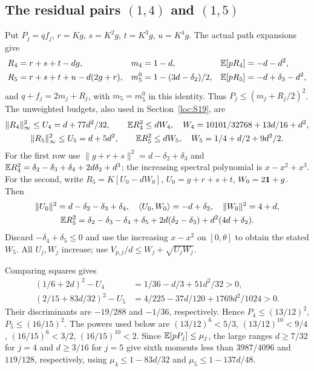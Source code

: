 \subsection[The residual pairs (1,4) and (1,5)]{The residual pairs $(1,4)$ and $(1,5)$}\label{loc:S8}
Put $P_j=qf_j$, $r=Kg$, $s=K^2g$, $t=K^3g$, $u=K^4g$.
The actual path expansions give
\begin{align*}
 R_4&=r+s+t-dg,&m_4&=1-d,&\mathbb E[pR_4]&=-d-d^2,\\
 R_5&=r+s+t+u-d(2g+r),&m_5^0&=1-(3d-\delta_{2})/2,&\mathbb E[pR_5]&=-d+\delta_{3}-d^2,
\end{align*}
and $q+f_j=2m_j+R_j$, with $m_5=m_5^0$ in this identity.
Thus $P_j\le(m_j+R_j/2)^2$.
The unweighted budgets, also used in Section~\ref{loc:S19}, are
\begin{gather*}
 \|R_4\|_\infty^2\le U_4=d+77d^2/32,\qquad
 \mathbb E R_4^2\le dW_4,\quad W_4=10101/32768+13d/16+d^2,\\
 \|R_5\|_\infty^2\le U_5=d+5d^2,\qquad
 \mathbb E R_5^2\le dW_5,\quad W_5=1/4+d/2+9d^2/2.
\end{gather*}
For the first row use
$\|g+r+s\|^2=d-\delta_{2}+\delta_{3}$ and
$\mathbb E R_4^2=\delta_{2}-\delta_{3}+\delta_{4}+2d\delta_{2}+d^3$;
the increasing spectral polynomial is $x-x^2+x^3$.
For the second, write $R_5=K[U_0-dW_0]$,
$U_0=g+r+s+t$, $W_0=2\mathbf1+g$. Then
\begin{gather*}
 \|U_0\|^2=d-\delta_{2}-\delta_{3}+\delta_{4},\quad
 \langle U_0,W_0\rangle=-d+\delta_{2},\quad\|W_0\|^2=4+d,\\
 \mathbb E R_5^2=\delta_{2}-\delta_{3}-\delta_{4}+\delta_{5}+2d(\delta_{2}-\delta_{3})+d^2(4d+\delta_{2}).
\end{gather*}
Discard $-\delta_{4}+\delta_{5}\le0$ and use the increasing $x-x^2$ on
$[0,\theta]$ to obtain the stated $W_5$.
All $U_j,W_j$ increase; use $V_{p,j}/d\le W_j+\sqrt{U_jW_j}$.

Comparing squares gives
\begin{align*}
 (1/6+2d)^2-U_4&=1/36-d/3+51d^2/32>0,\\
 (2/15+83d/32)^2-U_5&=4/225-37d/120+1769d^2/1024>0.
\end{align*}
Their discriminants are $-19/288$ and $-1/36$, respectively.
Hence $P_4\le(13/12)^2$, $P_5\le(16/15)^2$.
The powers used below are
$(13/12)^6<5/3$, $(13/12)^{10}<9/4$,
$(16/15)^6<3/2$, $(16/15)^{10}<2$.
Since $\mathbb E[pP_j]\le\mu_j$,
the large ranges $d\ge7/32$ for $j=4$ and $d\ge3/16$ for $j=5$
give sixth moments less than $3987/4096$ and $119/128$, respectively,
using $\mu_4\le1-83d/32$ and $\mu_5\le1-137d/48$.

